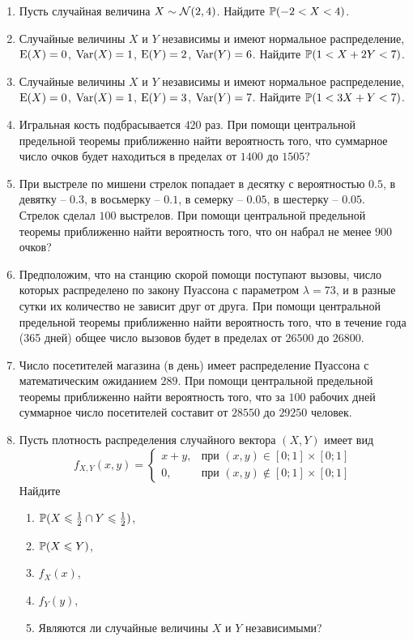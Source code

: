 \begin{enumerate}
\item Пусть случайная величина $X \sim \cN(2,4)$. Найдите $\P(-2<X<4)$.

\item Случайные величины $X$ и $Y$ независимы и  имеют нормальное распределение,
$\E(X) = 0 $, $\Var(X) = 1$, $\E(Y) = 2$, $\Var(Y) = 6$. Найдите $\P(1 < X + 2Y < 7)$.

\item Случайные величины $X$ и $Y$ независимы и  имеют нормальное распределение,
$\E(X) = 0 $, $\Var(X) = 1$, $\E(Y) = 3$, $\Var(Y) = 7$. Найдите $\P(1 < 3X + Y < 7)$.

\item Игральная кость подбрасывается $420$ раз.
При помощи центральной предельной теоремы приближенно найти вероятность того,
что суммарное число очков будет находиться в пределах от $1400$ до $1505$?

\item При выстреле по мишени стрелок попадает в десятку с вероятностью $0.5$,
в девятку – $0.3$, в восьмерку – $0.1$, в семерку – $0.05$, в шестерку – $0.05$.
Стрелок сделал $100$ выстрелов.
При помощи центральной предельной теоремы приближенно найти вероятность того,
что он набрал не менее $900$ очков?

\item Предположим, что на станцию скорой помощи поступают вызовы,
число которых распределено по закону Пуассона с параметром $\lambda = 73$,
и в разные сутки их количество не зависит друг от друга.
При помощи центральной предельной теоремы приближенно найти вероятность того,
что в течение года (365 дней) общее число вызовов будет в пределах от $26500$ до $26800$.

\item Число посетителей магазина (в день) имеет распределение Пуассона
с математическим ожиданием $289$.
При помощи центральной предельной теоремы приближенно найти вероятность того,
что за $100$ рабочих дней суммарное число посетителей составит
от $28550$ до $29250$ человек.

\item Пусть плотность распределения случайного вектора $(X,Y)$ имеет вид
\[
f_{X,Y}(x,y) =
\begin{cases}
x+y, & \text{при } (x,y) \in [0;1] \times [0;1] \\
0 , & \text{при } (x,y) \not\in [0;1] \times [0;1]
\end{cases}
\]
Найдите
\begin{enumerate}
\item $\P(X \leq \frac{1}{2} \cap Y \leq \frac{1}{2})$,
\item $\P(X\leq Y)$,
\item $f_{X}(x)$,
\item $f_{Y}(y)$,
\item Являются ли случайные величины $X$ и $Y$ независимыми?
\end{enumerate}


\end{enumerate}
